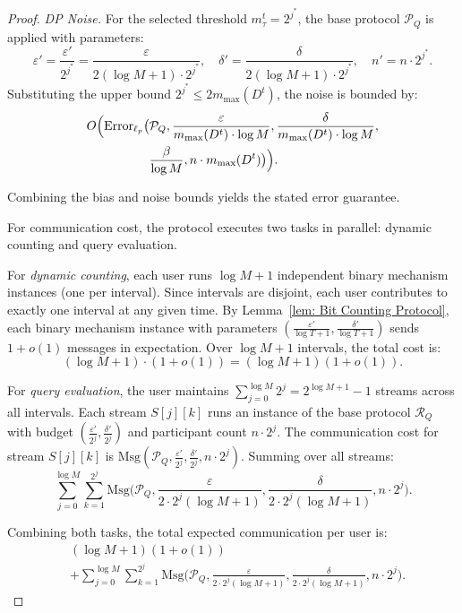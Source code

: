 \begin{proof}
\emph{DP Noise.}
For the selected threshold $m_\tau^t = 2^{j^*}$, the base protocol $\mathcal{P}_Q$ is applied with parameters:
\[
\varepsilon' = \frac{\varepsilon'}{2^{j^*}} = \frac{\varepsilon}{2(\log M+1) \cdot 2^{j^*}}, \quad \delta' = \frac{\delta}{2(\log M+1) \cdot 2^{j^*}}, \quad n' = n \cdot 2^{j^*}.
\]
Substituting the upper bound $2^{j^*} \le 2m_{\max}(D^t)$, the noise is bounded by:
\[
\begin{aligned}
    O\Big( \mathrm{Error}_{\ell_p}\big( &\mathcal{P}_Q, \frac{\varepsilon}{m_{\max}(D^t) \cdot \log M}, \frac{\delta}{m_{\max}(D^t) \cdot \log M}, \\ &\frac{\beta}{\log M}, n \cdot m_{\max}(D^t)\big) \Big).
\end{aligned}
\]

Combining the bias and noise bounds yields the stated error guarantee.

For communication cost, the protocol executes two tasks in parallel: dynamic counting and query evaluation.

For \emph{dynamic counting}, each user runs $\log M+1$ independent binary mechanism instances (one per interval). 
Since intervals are disjoint, each user contributes to exactly one interval at any given time. 
By Lemma~\ref{lem: Bit Counting Protocol}, each binary mechanism instance with parameters $(\frac{\varepsilon'}{\log T+1}, \frac{\delta'}{\log T+1})$ sends $1 + o(1)$ messages in expectation.
Over $\log M+1$ intervals, the total cost is:
\[
(\log M+1) \cdot (1 + o(1)) = (\log M+1)(1+o(1)).
\]

For \emph{query evaluation}, the user maintains $\sum_{j=0}^{\log M} 2^j = 2^{\log M+1}-1$ streams across all intervals.
Each stream $S[j][k]$ runs an instance of the base protocol $\mathcal{R}_Q$ with budget $(\frac{\varepsilon'}{2^j}, \frac{\delta'}{2^j})$ and participant count $n \cdot 2^j$.
The communication cost for stream $S[j][k]$ is $\mathrm{Msg}(\mathcal{P}_Q, \frac{\varepsilon'}{2^j}, \frac{\delta'}{2^j}, n \cdot 2^j)$.
Summing over all streams:
\[
\sum_{j=0}^{\log M} \sum_{k=1}^{2^j} \mathrm{Msg}\Big(\mathcal{P}_Q, \frac{\varepsilon}{2\cdot 2^j(\log M+1)}, \frac{\delta}{2\cdot 2^j(\log M+1)}, n \cdot 2^j\Big).
\]

Combining both tasks, the total expected communication per user is:
\[
\begin{aligned}
    &(\log M+1)(1+o(1)) \\&+ \sum_{j=0}^{\log M} \sum_{k=1}^{2^j} \mathrm{Msg}\Big(\mathcal{P}_Q, \frac{\varepsilon}{2\cdot 2^j(\log M+1)}, \frac{\delta}{2\cdot 2^j(\log M+1)}, n \cdot 2^j\Big).
\end{aligned}
\]

\end{proof}